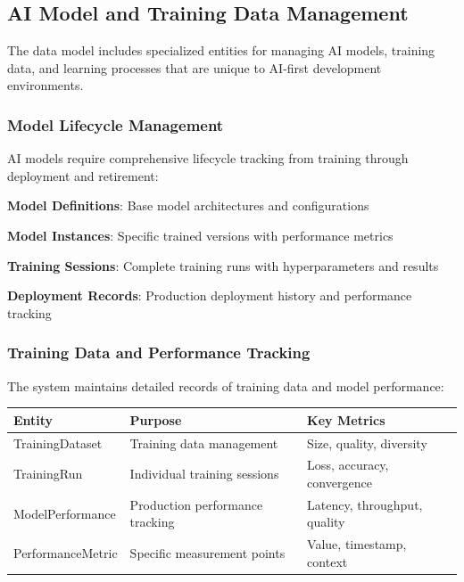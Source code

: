\subsection*{AI Model and Training Data Management}

The data model includes specialized entities for managing AI models, training data, and learning processes that are unique to AI-first development environments.

\subsubsection*{Model Lifecycle Management}

AI models require comprehensive lifecycle tracking from training through deployment and retirement:

\begin{expandedlist}
    \item \textbf{Model Definitions}: Base model architectures and configurations
    \item \textbf{Model Instances}: Specific trained versions with performance metrics
    \item \textbf{Training Sessions}: Complete training runs with hyperparameters and results
    \item \textbf{Deployment Records}: Production deployment history and performance tracking
\end{expandedlist}

\subsubsection*{Training Data and Performance Tracking}

The system maintains detailed records of training data and model performance:

\begin{center}
\begin{tabular}{@{}lll@{}}
\toprule
\textbf{Entity} & \textbf{Purpose} & \textbf{Key Metrics} \\
\midrule
TrainingDataset & Training data management & Size, quality, diversity \\
TrainingRun & Individual training sessions & Loss, accuracy, convergence \\
ModelPerformance & Production performance tracking & Latency, throughput, quality \\
PerformanceMetric & Specific measurement points & Value, timestamp, context \\
\bottomrule
\end{tabular}
\end{center}

